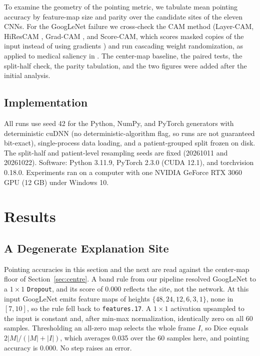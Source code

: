\documentclass[conference]{IEEEtran}
\begin{document}
To examine the geometry of the pointing metric, we tabulate mean pointing accuracy by feature-map size and parity over the candidate sites of the eleven CNNs. For the GoogLeNet failure we cross-check the CAM method (Layer-CAM, HiResCAM \cite{draelos_hirescam_2021}, Grad-CAM \cite{santos_caveats_2025}, and Score-CAM, which scores masked copies of the input instead of using gradients \cite{suri_covlias_2022,taimeskhanov_walls_2024}) and run cascading weight randomization, as applied to medical saliency in \cite{arun_trustworthiness_2021}. The center-map baseline, the paired tests, the split-half check, the parity tabulation, and the two figures were added after the initial analysis.

\subsection{Implementation}\label{sec:impl}
All runs use seed 42 for the Python, NumPy, and PyTorch generators with deterministic cuDNN (no deterministic-algorithm flag, so runs are not guaranteed bit-exact), single-process data loading, and a patient-grouped split frozen on disk. The split-half and patient-level resampling seeds are fixed (20261011 and 20261022). Software: Python 3.11.9, PyTorch 2.3.0 (CUDA 12.1), and torchvision 0.18.0. Experiments ran on a computer with one NVIDIA GeForce RTX 3060 GPU (12 GB) under Windows 10.

\section{Results}\label{sec:results}

\subsection{A Degenerate Explanation Site}\label{sec:degenerate}
Pointing accuracies in this section and the next are read against the center-map floor of Section~\ref{sec:centre}. A band rule from our pipeline resolved GoogLeNet to a $1\times1$ \texttt{Dropout}, and its score of 0.000 reflects the site, not the network. At this input GoogLeNet emits feature maps of heights $\{48,24,12,6,3,1\}$, none in $[7,10]$, so the rule fell back to \texttt{features.17}. A $1\times1$ activation upsampled to the input is constant and, after min-max normalization, identically zero on all 60 samples. Thresholding an all-zero map selects the whole frame $I$, so Dice equals $2|M|/(|M|+|I|)$, which averages 0.035 over the 60 samples here, and pointing accuracy is 0.000. No step raises an error.
\end{document}
